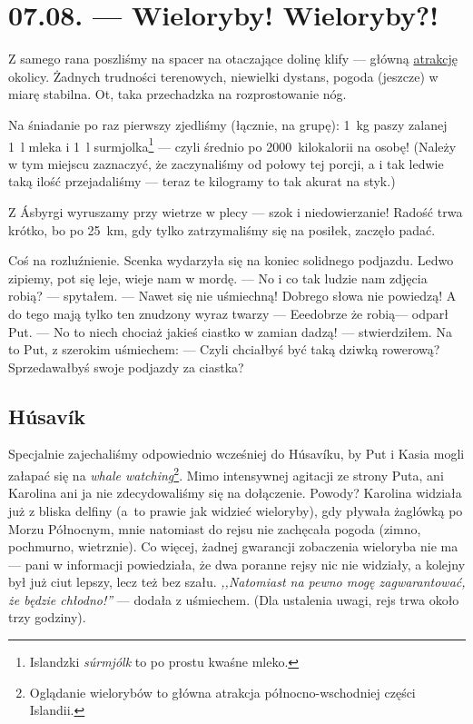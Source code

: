 \chapter*{07.08. --- Wieloryby! Wieloryby?!}

Z samego rana poszliśmy na spacer na otaczające dolinę klify --- głów\-ną \href{http://www.visithusavik.com/attractions/asbyrgi-canyon/}{atrakcję} okolicy. Żadnych trudności terenowych, niewielki dystans, pogoda (jeszcze) w miarę stabilna. Ot, taka przechadzka na rozprostowanie nóg.

Na śniadanie po raz pierwszy zjedliśmy (łącznie, na grupę): 1~kg paszy zalanej 1~l mleka i 1~l surmjolka\footnote{Islandzki \emph{súrmjólk} to po prostu kwaśne mleko.} --- czyli średnio po 2000~kilokalorii na osobę! (Należy w tym miejscu zaznaczyć, że zaczynaliśmy od połowy tej porcji, a i tak ledwie taką ilość przejadaliśmy --- teraz te kilogramy to tak akurat na styk.)


Z Ásbyrgi wyruszamy przy wietrze w plecy --- szok i niedowierzanie! Radość trwa krótko, bo po 25~km, gdy tylko zatrzymaliśmy się na posiłek, zaczęło padać.

\medskip

Coś na rozluźnienie. Scenka wydarzyła się na koniec solidnego podjazdu. Ledwo zipiemy, pot się leje, wieje nam w mordę. \newline
--- No i co tak ludzie nam zdjęcia robią? --- spytałem. --- Nawet się nie uśmiechną! Dobrego słowa nie powiedzą! A do tego mają tylko ten znudzony wyraz twarzy\textellipsis \newline
--- Eee\textellipsis dobrze że robią\textellipsis --- odparł Put. \newline
--- No to niech chociaż jakieś ciastko w zamian dadzą! --- stwierdziłem. \newline
Na to Put, z szerokim uśmiechem: \newline
--- Czyli chciałbyś być taką dziwką rowerową? Sprzedawałbyś swoje podjazdy za ciastka?

\section*{Húsavík}

Specjalnie zajechaliśmy odpowiednio wcześniej do Húsavíku, by Put i Kasia mogli załapać się na \emph{whale watching}\footnote{Oglądanie wielorybów to główna atrakcja północno-wschodniej części Islandii.}. Mimo intensywnej agitacji ze strony Puta, ani Karolina ani ja nie zdecydowaliśmy się na dołączenie. Powody? Karolina widziała już z bliska delfiny (a~to prawie jak widzieć wieloryby), gdy pływała żaglówką po Morzu Północnym, mnie natomiast do rejsu nie zachęcała pogoda (zimno, pochmurno, wietrznie). Co więcej, żadnej gwarancji zobaczenia wieloryba nie ma --- pani w informacji powiedziała, że dwa poranne rejsy nic nie widziały, a kolejny był już ciut lepszy, lecz też bez szału. \emph{,,Natomiast na pewno mogę zagwarantować, że będzie chłodno!''} --- dodała z uśmiechem. (Dla ustalenia uwagi, rejs trwa około trzy godziny).

